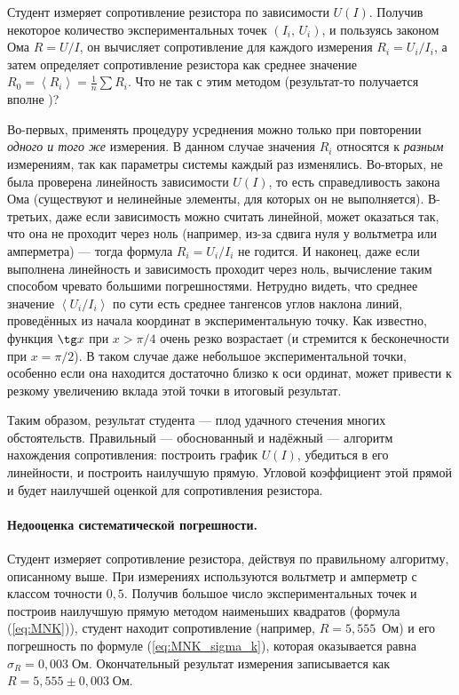 Студент измеряет сопротивление резистора по зависимости $U\!\left(I\right)$.
Получив некоторое количество экспериментальных точек
$\left(I_{i},\,U_{i}\right)$,
и пользуясь законом Ома $R=U/I$, он вычисляет сопротивление для каждого
измерения $R_{i}=U_{i}/I_{i}$, а затем определяет сопротивление резистора
как среднее значение $R_{0}=\left\langle R_{i}\right\rangle =\frac{1}{n}\sum
R_{i}$.
Что не так с этим методом (результат-то получается вполне )?

\begin{longnote}
    Во-первых, применять процедуру усреднения можно только
    при повторении \emph{одного и того же} измерения. В данном случае значения
$R_{i}$
    относятся к \emph{разным} измерениям, так как параметры системы каждый раз
изменялись.
    Во-вторых, не была проверена линейность зависимости $U\left(I\right)$, то
есть
    справедливость закона Ома (существуют и нелинейные элементы,
    для которых он не выполняется). В-третьих, даже если зависимость
    можно считать линейной, может оказаться так, что она не проходит через
    ноль (например, из-за сдвига нуля у вольтметра или амперметра) ---
    тогда формула $R_{i}=U_{i}/I_{i}$ не годится.
    И наконец, даже если выполнена линейность и зависимость проходит через
    ноль, вычисление таким способом чревато большими погрешностями. Нетрудно
    видеть, что среднее значение $\left\langle U_{i}/I_{i}\right\rangle $
    по сути есть среднее тангенсов углов наклона линий, проведённых из
    начала координат в экспериментальную точку. Как известно,
    функция $\tg x$ при $x>\pi/4$ очень резко возрастает (и стремится
    к бесконечности при $x=\pi/2$). В таком случае даже небольшое 
    экспериментальной точки, особенно если она находится достаточно близко
    к оси ординат, может привести к резкому увеличению вклада этой точки
    в итоговый результат.

    Таким образом,  результат студента --- плод удачного стечения
многих
    обстоятельств. Правильный --- обоснованный и надёжный --- алгоритм
    нахождения сопротивления: построить график $U\left(I\right)$, убедиться
    в его линейности, и построить наилучшую прямую. 
    Угловой коэффициент этой прямой и будет наилучшей оценкой 
    для сопротивления резистора.
\end{longnote}


\paragraph{Недооценка систематической погрешности.}
Студент измеряет сопротивление резистора, действуя по правильному
алгоритму, описанному выше. При измерениях используются вольтметр
и амперметр с классом точности $0{,}5$. Получив большое число экспериментальных
точек и построив наилучшую прямую методом наименьших квадратов (формула
(\ref{eq:MNK})), студент находит сопротивление (например, $R=5{,}555$~Ом)
и его погрешность по формуле (\ref{eq:MNK_sigma_k}), которая оказывается
равна $\sigma_{R}=0{,}003\;\text{Ом}.$ Окончательный результат измерения
записывается как $R=5{,}555\pm0{,}003\;\text{Ом}$.

